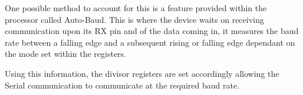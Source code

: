 One possible method to account for this is a feature provided within the processor called Auto-Baud\cite{mbed_datasheet}. This is where the device waits on receiving communication upon its RX pin and of the data coming in, it measures the baud rate between a falling edge and a subsequent rising or falling edge dependant on the mode set within the registers.

Using this information, the divisor registers are set accordingly allowing the Serial communication to communicate at the required baud rate. 

